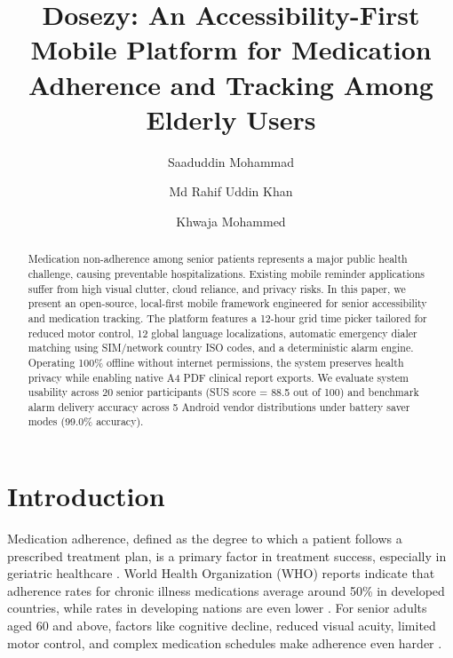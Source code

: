 \documentclass[10pt]{article}
\begin{document}
\begin{opening}

\title{Dosezy: An Accessibility-First Mobile Platform for Medication Adherence and Tracking Among Elderly Users}

\author[Department of Computer Science and Engineering, Methodist College of Engineering and Technology, Hyderabad, India, 160723733051@methodist.edu.in]{Saaduddin Mohammad}

\author[Department of Computer Science and Engineering, Methodist College of Engineering and Technology, Hyderabad, India, 160723733005@methodist.edu.in]{Md Rahif Uddin Khan}

\author[Department of Computer Science and Engineering, Methodist College of Engineering and Technology, Hyderabad, India, 160723733063@methodist.edu.in]{Khwaja Mohammed}

\begin{abstract}
Medication non-adherence among senior patients represents a major public health challenge, causing preventable hospitalizations. Existing mobile reminder applications suffer from high visual clutter, cloud reliance, and privacy risks. In this paper, we present an open-source, local-first mobile framework engineered for senior accessibility and medication tracking. The platform features a 12-hour grid time picker tailored for reduced motor control, 12 global language localizations, automatic emergency dialer matching using SIM/network country ISO codes, and a deterministic alarm engine. Operating 100\% offline without internet permissions, the system preserves health privacy while enabling native A4 PDF clinical report exports. We evaluate system usability across 20 senior participants (SUS score = 88.5 out of 100) and benchmark alarm delivery accuracy across 5 Android vendor distributions under battery saver modes (99.0\% accuracy).
\end{abstract}


\end{opening}

\section{Introduction}

Medication adherence, defined as the degree to which a patient follows a prescribed treatment plan, is a primary factor in treatment success, especially in geriatric healthcare \cite{who2003adherence}. World Health Organization (WHO) reports indicate that adherence rates for chronic illness medications average around 50\% in developed countries, while rates in developing nations are even lower \cite{who2003adherence}. For senior adults aged 60 and above, factors like cognitive decline, reduced visual acuity, limited motor control, and complex medication schedules make adherence even harder \cite{haynes2002helping}.
\end{document}
